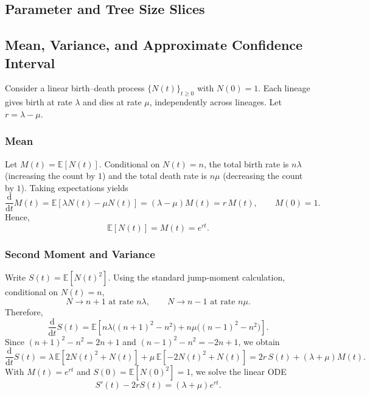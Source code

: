 {\clearpage
\subsection{Parameter and Tree Size Slices}
\label{appendix::pars-slices}


\clearpage
\subsection{Mean, Variance, and Approximate Confidence Interval}
\label{appendix::confidence-birthdeath}
\noindent
Consider a linear birth--death process \(\{N(t)\}_{t\ge 0}\) with \(N(0)=1\). Each lineage gives birth at rate \(\lambda\) and dies at rate \(\mu\), independently across lineages. Let \(r=\lambda-\mu\).

\subsubsection*{Mean}
Let \(M(t)=\mathbb{E}[N(t)]\). Conditional on \(N(t)=n\), the total birth rate is \(n\lambda\) (increasing the count by \(1\)) and the total death rate is \(n\mu\) (decreasing the count by \(1\)). Taking expectations yields
\begin{equation}
\frac{\mathrm{d}}{\mathrm{d}t}M(t)
=
\mathbb{E}[\lambda N(t)-\mu N(t)]
=
(\lambda-\mu)M(t)
=
r\,M(t),
\qquad M(0)=1.
\end{equation}
Hence,
\begin{equation}
\boxed{\mathbb{E}[N(t)]=M(t)=e^{rt}.}
\end{equation}

\subsubsection*{Second Moment and Variance}
Write \(S(t)=\mathbb{E}[N(t)^2]\). Using the standard jump-moment calculation, conditional on \(N(t)=n\),
\begin{equation}
N \to n+1 \text{ at rate } n\lambda,
\qquad
N \to n-1 \text{ at rate } n\mu.
\end{equation}
Therefore,
\begin{equation}
\frac{\mathrm{d}}{\mathrm{d}t}S(t)
=
\mathbb{E}\!\left[
n\lambda\bigl((n+1)^2-n^2\bigr)
+
n\mu\bigl((n-1)^2-n^2\bigr)
\right].
\end{equation}
Since \((n+1)^2-n^2=2n+1\) and \((n-1)^2-n^2=-2n+1\), we obtain
\begin{equation}
\frac{\mathrm{d}}{\mathrm{d}t}S(t)
=
\lambda\,\mathbb{E}[2N(t)^2+N(t)]
+
\mu\,\mathbb{E}[-2N(t)^2+N(t)]
=
2r\,S(t)+(\lambda+\mu)M(t).
\end{equation}
With \(M(t)=e^{rt}\) and \(S(0)=\mathbb{E}[N(0)^2]=1\), we solve the linear ODE
\begin{equation}
S'(t)-2rS(t)=(\lambda+\mu)e^{rt}.
\end{equation}

}
